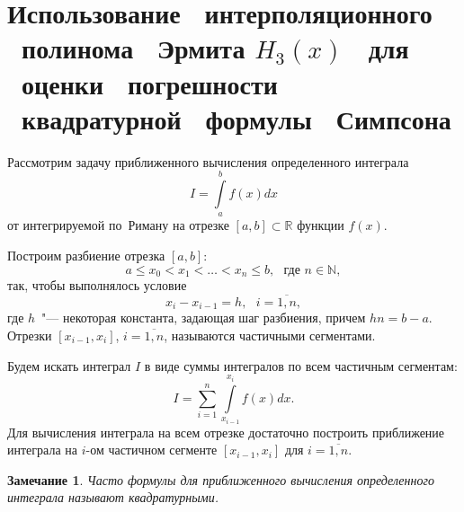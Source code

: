 \documentclass[11pt,a4paper,twoside,listtotoc,bibtotoc]{report}
\numberwithin{equation}{section}
\theoremstyle{definition}
\theoremstyle{plain}
\newtheorem*{note*}{Замечание}
\begin{document}
\section[Оценка погрешности формулы Симпсона при помощи полинома Эрмита]
{Использование ~интерполяционного ~полинома ~Эрмита $H_3(x)$
~для ~оценки ~погрешности ~квадратурной ~формулы ~Симпсона}
%
Рассмотрим задачу приближенного вычисления определенного интеграла
%
\begin{equation}
%
    \label{Integr}
    I = \int\limits_{a}^{b}{f(x)dx}
%
\end{equation}
%
от интегрируемой по~Риману на отрезке $[a,b]\subset\mathbb{R}$ функции $f(x)$.

Построим разбиение отрезка $[a,b]$:
%
$$
    a \leqslant x_0 < x_1 < \ldots < x_n \leqslant b,
    ~~~\mbox{где $n\in\mathbb{N}$},
$$
%
так, чтобы выполнялось условие
%
$$
    x_i-x_{i-1} = h, ~~~i=\overline{1,n},
$$
%
где $h$~"--- некоторая константа, задающая шаг разбиения, причем $hn = b-a$.
Отрезки $[x_{i-1},x_i]$, $i=\overline{1,n}$, называются частичными сегментами.

Будем искать интеграл $I$ в виде суммы интегралов по всем частичным сегментам:
%
\begin{equation}
%
    \label{Integr_sum}
    I = \sum_{i=1}^{n} \int\limits_{x_{i-1}}^{x_i}{f(x)dx}.
\end{equation}
%
Для вычисления интеграла на всем отрезке достаточно построить приближение
интеграла на $i$-ом частичном сегменте $[x_{i-1},x_i]$ для
$i=\overline{1,n}$.
%
\begin{note*}
%
     Часто формулы для приближенного вычисления определенного интеграла
     называют квадратурными.
%
\end{note*}
%
\end{document}
